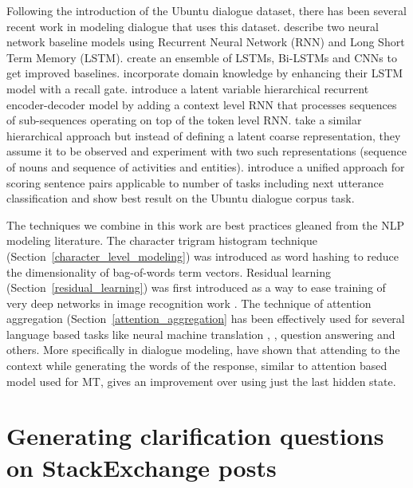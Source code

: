 \documentclass[11pt]{report}
\begin{document}
Following the introduction of the Ubuntu dialogue dataset, there has been several recent work in modeling dialogue that uses this dataset. \cite{DBLP:conf/sigdial/LowePSP15} describe two neural network baseline models using Recurrent Neural Network (RNN) and Long Short Term Memory (LSTM). 
\cite{DBLP:journals/corr/KadlecSK15} create an ensemble of LSTMs, Bi-LSTMs and CNNs to get improved baselines. 
\cite{xu2016incorporating} incorporate domain knowledge by enhancing their LSTM model with a recall gate.
\cite{serban2016hierarchical} introduce a latent variable hierarchical recurrent encoder-decoder model by adding a context level RNN that processes sequences of sub-sequences operating on top of the token level RNN.
\cite{serban2016multiresolution} take a similar hierarchical approach but instead of defining a latent coarse representation, they assume it to be observed and experiment with two such representations (sequence of nouns and sequence of activities and entities).
\cite{baudivs2016sentence} introduce a unified approach for scoring sentence pairs applicable to number of tasks including next utterance classification and show best result on the Ubuntu dialogue corpus task. 

The techniques we combine in this work are best practices gleaned from the NLP modeling literature. 
The character trigram histogram technique (Section~\ref{character_level_modeling}) was introduced as word hashing \cite{DBLP:conf/cikm/HuangHGDAH13} to reduce the dimensionality of bag-of-words term vectors. Residual learning (Section~\ref{residual_learning}) was first introduced as a way to ease training of very deep networks in image recognition work \cite{he2015deep}. The technique of attention aggregation (Section~\ref{attention_aggregation} has been effectively used for several language based tasks like neural machine translation \cite{DBLP:journals/corr/BahdanauCB14}, \cite{DBLP:conf/emnlp/LuongPM15}, question answering \cite{} and others. More specifically in dialogue modeling, \cite{DBLP:journals/corr/YaoPZW16} have shown that attending to the context while generating the words of the response, similar to attention based model used for MT, gives an improvement over using just the last hidden state.


\newpage

\chapter{Generating clarification questions on StackExchange posts}\label{stackexchange}
\end{document}

